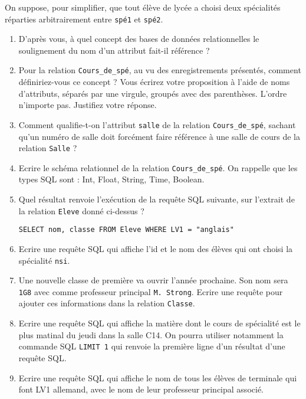 \documentclass[11pt,a4paper,french,twoside]{PMCours}
\begin{document}
On suppose, pour simplifier, que tout élève de lycée a choisi deux spécialités réparties arbitrairement entre \verb'spé1' et \verb'spé2'.

\begin{enumerate}

\item D'après vous, à quel concept des bases de données relationnelles le soulignement du nom d'un attribut fait-il référence ?


\item Pour la relation \verb'Cours_de_spé', au vu des enregistrements présentés, comment définiriez-vous ce concept ? Vous écrirez votre proposition à l'aide de noms d'attributs, séparés par une virgule, groupés avec des parenthèses. L'ordre n'importe pas. Justifiez votre réponse.

\item Comment qualifie-t-on l'attribut \verb'salle' de la relation \verb'Cours_de_spé', sachant qu'un numéro de salle doit forcément faire référence à une salle de cours de la relation \verb'Salle' ?

\item Ecrire le schéma relationnel de la relation \verb'Cours_de_spé'. On rappelle que les types SQL sont : Int, Float, String, Time, Boolean.

\item Quel résultat renvoie l'exécution de la requête SQL suivante, sur l'extrait de la relation \verb'Eleve' donné ci-dessus ? 
\begin{verbatim}
SELECT nom, classe FROM Eleve WHERE LV1 = "anglais"
\end{verbatim}


\item Ecrire une requête SQL qui affiche l'id et le nom des élèves qui ont choisi la spécialité \verb'nsi'.


\item Une nouvelle classe de première va ouvrir l'année prochaine. Son nom sera \verb'1G8' avec comme professeur principal \verb'M. Strong'. Ecrire une requête pour ajouter ces informations dans la relation \verb'Classe'.

\item Ecrire une requête SQL qui affiche la matière dont le cours de spécialité est le plus matinal du jeudi dans la salle C14. On pourra utiliser notamment la commande SQL \verb'LIMIT 1' qui renvoie la première ligne d'un résultat d'une requête SQL.


\item Ecrire une requête SQL qui affiche le nom de tous les élèves de terminale qui font LV1 allemand, avec le nom de leur professeur principal associé.



\end{enumerate}
\end{document}
